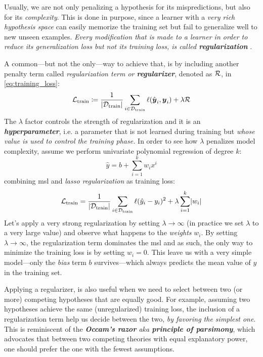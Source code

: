 \label{subsec:regularization}
Usually, we are not only penalizing a hypothesis for its mispredictions, but
also for its \emph{complexity}. This is done in purpose, since a learner with a
\emph{very rich hypothesis space} can easily memorize the training set but fail
to generalize well to new unseen examples. \emph{Every modification that is made
to a learner in order to reduce its generalization loss but not its training
loss, is called \textbf{regularization}} \parencite{deeplearning}.

A common---but not the only---way to achieve that, is by including another
penalty term called \emph{regularization term or
\textbf{regularizer}}, denoted as $\mathcal{R}$, in \Equation{}
\ref{eq:training_loss}:
\begin{equation}
	\label{eq:regularization}
	\mathcal{L}_\text{train} \coloneqq \frac{1}{\lvert \mathcal{D}_\text{train} \rvert} \sum_{i \in \mathcal{D}_\text{train}}
	\ell(\hat{\boldsymbol{y}}_i, \boldsymbol{y}_i)
	+
	\lambda \mathcal{R}
\end{equation}
The $\lambda$ factor controls the strength of regularization and it is an
\emph{\textbf{hyperparameter}}, i.e. a parameter that is
not learned during training but \emph{whose value is used to control the
training phase.} In order to see how $\lambda$ penalizes
model complexity, assume we perform univariate polynomial
regression of degree $k$:
\begin{equation}
	\hat{y} = b + \sum_{i=1}^k w_i x^i
\end{equation}
combining \gls{msl} and \emph{lasso
regularization} as training loss:
\begin{equation}
	\label{eq:lasso}
	\mathcal{L}_\text{train} = \frac{1}{\lvert \mathcal{D}_\text{train} \rvert} \sum_{i \in \mathcal{D}_\text{train}}
	\ell(\hat{y}_i - y_i)^2
	+
	\lambda \sum_{i=1}^k \lvert w_i \rvert
\end{equation}
Let's apply a very strong regularization by setting $\lambda \to \infty$ (in
practice we set $\lambda$ to a very large value) and observe what happens to the
\emph{weights} $w_i$. By setting $\lambda \to
\infty$, the regularization term dominates the \gls{msl} and as such, the only
way to minimize the training loss is by setting $w_i = 0$. This leave us
with a very simple model---only the \emph{bias} term $b$
survives---which always predicts the mean value of $y$ in the training set.

Applying a regularizer, is also useful when we need to select
between two (or more) competing hypotheses that are equally good. For example,
assuming two hypotheses achieve the same (unregularized) training loss, the
inclusion of a regularization term help us decide between the two, \emph{by
favoring the simplest one}. This is reminiscent of the \emph{\textbf{Occam's
razor} aka \textbf{principle of parsimony}}, which advocates that between two competing theories with equal
explanatory power, one should prefer the one with the fewest assumptions.

